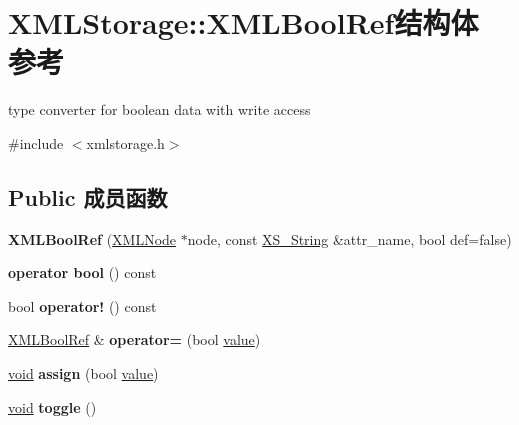 \hypertarget{struct_x_m_l_storage_1_1_x_m_l_bool_ref}{}\section{X\+M\+L\+Storage\+:\+:X\+M\+L\+Bool\+Ref结构体 参考}
\label{struct_x_m_l_storage_1_1_x_m_l_bool_ref}


type converter for boolean data with write access  




{\ttfamily \#include $<$xmlstorage.\+h$>$}

\subsection*{Public 成员函数}
\begin{DoxyCompactItemize}
\item 
\mbox{\label{struct_x_m_l_storage_1_1_x_m_l_bool_ref_aa5a3e2de23a5967d486c3bf24190b10b}} 
{\bfseries X\+M\+L\+Bool\+Ref} (\hyperlink{struct_x_m_l_storage_1_1_x_m_l_node}{X\+M\+L\+Node} $\ast$node, const \hyperlink{struct_x_m_l_storage_1_1_x_s___string}{X\+S\+\_\+\+String} \&attr\+\_\+name, bool def=false)
\item 
\mbox{\label{struct_x_m_l_storage_1_1_x_m_l_bool_ref_aca9e855bdc841a9b4ab0ee4a7efa9649}} 
{\bfseries operator bool} () const
\item 
\mbox{\label{struct_x_m_l_storage_1_1_x_m_l_bool_ref_a5b4dc5ec31fc75f5c8c633f1b1787d91}} 
bool {\bfseries operator!} () const
\item 
\mbox{\label{struct_x_m_l_storage_1_1_x_m_l_bool_ref_a003622acf2cae9a19901a14216994b88}} 
\hyperlink{struct_x_m_l_storage_1_1_x_m_l_bool_ref}{X\+M\+L\+Bool\+Ref} \& {\bfseries operator=} (bool \hyperlink{unionvalue}{value})
\item 
\mbox{\label{struct_x_m_l_storage_1_1_x_m_l_bool_ref_a89a1d6796f28fe59aaeb4faf5462fff3}} 
\hyperlink{interfacevoid}{void} {\bfseries assign} (bool \hyperlink{unionvalue}{value})
\item 
\mbox{\label{struct_x_m_l_storage_1_1_x_m_l_bool_ref_a97b396cfe85a9b7ccca755fe1d811a69}} 
\hyperlink{interfacevoid}{void} {\bfseries toggle} ()
\end{DoxyCompactItemize}
